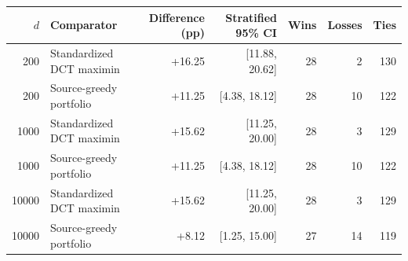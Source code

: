 \begin{tabular}{rlrrrrr}
\toprule
$d$ & Comparator & Difference (pp) & Stratified 95\% CI & Wins & Losses & Ties \\
\midrule
200 & Standardized DCT maximin & +16.25 & [11.88, 20.62] & 28 & 2 & 130 \\
200 & Source-greedy portfolio & +11.25 & [4.38, 18.12] & 28 & 10 & 122 \\
1000 & Standardized DCT maximin & +15.62 & [11.25, 20.00] & 28 & 3 & 129 \\
1000 & Source-greedy portfolio & +11.25 & [4.38, 18.12] & 28 & 10 & 122 \\
10000 & Standardized DCT maximin & +15.62 & [11.25, 20.00] & 28 & 3 & 129 \\
10000 & Source-greedy portfolio & +8.12 & [1.25, 15.00] & 27 & 14 & 119 \\
\bottomrule
\end{tabular}
